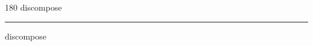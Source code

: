 
\begin{frame}
\begin{center}
\begin{turn}{180}
{\fontsize{2.5cm}{1em}\selectfont discompose}
\end{turn}
\vspace{1em}\par  
\hrule
\vspace{1em}\par  
{\fontsize{2.5cm}{1em}\selectfont discompose}
\end{center}
\end{frame}

